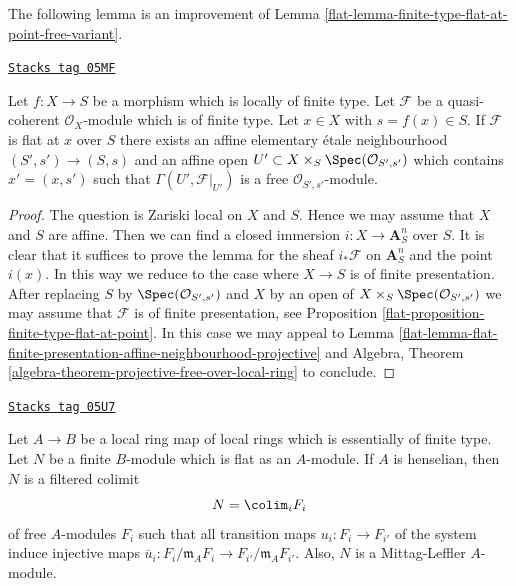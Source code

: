 The following lemma is an improvement of
Lemma \ref{flat-lemma-finite-type-flat-at-point-free-variant}.

\begin{lemma}
\label{flat-lemma-flat-finite-type-affine-neighbourhood-projective}
\href{https://stacks.math.columbia.edu/tag/05MF}{\texttt{Stacks tag 05MF}}

Let $f : X \to S$ be a morphism which is locally of finite type.
Let $\mathcal{F}$ be a quasi-coherent $\mathcal{O}_X$-module which is
of finite type. Let $x \in X$ with $s = f(x) \in S$.
If $\mathcal{F}$ is flat at $x$ over $S$ there exists an affine
elementary \'etale neighbourhood $(S', s') \to (S, s)$ and
an affine open $U' \subset X \times_S \Spec(\mathcal{O}_{S', s'})$
which contains $x' = (x, s')$ such that
$\Gamma(U', \mathcal{F}|_{U'})$ is a free
$\mathcal{O}_{S', s'}$-module.
\end{lemma}

\begin{proof}

The question is Zariski local on $X$ and $S$. Hence we may assume
that $X$ and $S$ are affine. Then we can find a closed immersion
$i : X \to \mathbf{A}^n_S$ over $S$. It is clear that it suffices to
prove the lemma for the sheaf $i_*\mathcal{F}$ on $\mathbf{A}^n_S$
and the point $i(x)$. In this way we reduce to the case where $X \to S$ is
of finite presentation. After replacing $S$ by
$\Spec(\mathcal{O}_{S', s'})$ and $X$ by an open of
$X \times_S \Spec(\mathcal{O}_{S', s'})$ we may assume that
$\mathcal{F}$ is of finite presentation, see
Proposition \ref{flat-proposition-finite-type-flat-at-point}.
In this case we may appeal to
Lemma \ref{flat-lemma-flat-finite-presentation-affine-neighbourhood-projective}
and
Algebra, Theorem \ref{algebra-theorem-projective-free-over-local-ring}
to conclude.
\end{proof}

\begin{lemma}
\label{flat-lemma-flat-finite-type-local-colimit-free}
\href{https://stacks.math.columbia.edu/tag/05U7}{\texttt{Stacks tag 05U7}}

Let $A \to B$ be a local ring map of local rings which is essentially of
finite type. Let $N$ be a finite $B$-module which is flat as an $A$-module.
If $A$ is henselian, then $N$ is a filtered colimit
$$
N = \colim_i F_i
$$
of free $A$-modules $F_i$ such that all transition maps
$u_i : F_i \to F_{i'}$ of the system induce injective maps
$\overline{u}_i : F_i/\mathfrak m_AF_i \to F_{i'}/\mathfrak m_AF_{i'}$.
Also, $N$ is a Mittag-Leffler $A$-module.
\end{lemma}

